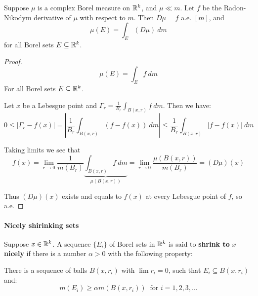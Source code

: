     \begin{theorem}\label{derivative}
        Suppose $\mu$ is a complex Borel measure on $\mathbb{R}^k$, and $\mu \ll m$. Let $f$ be the Radon-Nikodym derivative of $\mu$ with respect to $m$. Then $D\mu = f$ a.e. $[m]$, and
        \[\mu(E) = \int_E(D\mu)~dm\] for all Borel sets $E\subseteq \mathbb{R}^k$.
        \begin{proof}
            \[\mu(E) = \int_E f~dm\] For all Borel sets $E\subseteq \mathbb{R}^k$.

            Let $x$ be a Lebesgue point and $\Gamma_r = \frac{1}{B_r}\int_{B(x,r)}f~dm$. Then we have:\begin{equation*}
                0\leq |\Gamma_r - f(x)| = |\frac{1}{B_r}\int_{B(x,r)}(f-f(x))~dm| \leq \frac{1}{B_r}\int_{B(x,r)}|f-f(x)|~dm
            \end{equation*}

            Taking limits we see that \[f(x) = \lim_{r\rightarrow 0}\frac{1}{m(B_r)}\underbrace{\int_{B(x,r)}f~dm}_{\mu(B(x,r))} = \lim_{r\rightarrow 0}\frac{\mu(B(x,r))}{m(B_r)} = (D\mu)(x) \]
        
            Thus $(D\mu)(x)$ exists and equals to $f(x)$ at every Lebesgue point of $f$, so a.e.
        \end{proof}
    \end{theorem}

    \paragraph*{Nicely shirinking sets}
    \begin{definition}
        Suppose $x\in \mathbb{R}^k$. A sequence $\{E_i\}$ of Borel sets in $\mathbb{R}^k$ is said to \textbf{shrink to }$x$\textbf{ nicely} if there is a number $\alpha>0$ with the following property:\begin{center}
            There is a sequence of balls $B(x,r_i)$ with $\lim r_i = 0$, such that $E_i\subseteq B(x,r_i)$ and:\[m(E_i) \geq \alpha m(B(x,r_i)) \ \text{ for }i=1,2,3,\ldots \]
        \end{center}
    \end{definition}

